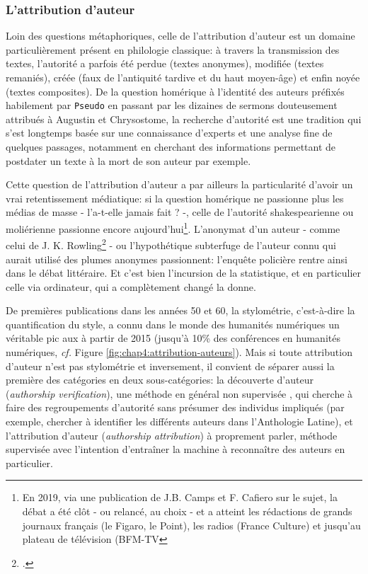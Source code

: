 \subsubsection{L'attribution d'auteur}

Loin des questions métaphoriques, celle de l'attribution d'auteur est un domaine particulièrement présent en philologie classique: à travers la transmission des textes, l'autorité a parfois été perdue (textes anonymes), modifiée (textes remaniés), créée (faux de l'antiquité tardive et du haut moyen-âge) et enfin noyée (textes composites). De la question homérique à l'identité des auteurs préfixés habilement par \texttt{Pseudo} en passant par les dizaines de sermons douteusement attribués à Augustin et Chrysostome, la recherche d'autorité est une tradition qui s'est longtemps basée sur une connaissance d'experts et une analyse fine de quelques passages, notamment en cherchant des informations permettant de postdater un texte à la mort de son auteur par exemple. 

Cette question de l'attribution d'auteur a par ailleurs la particularité d'avoir un vrai retentissement médiatique: si la question homérique ne passionne plus les médias de masse - l'a-t-elle jamais fait ? -, celle de l'autorité shakespearienne ou moliérienne passionne encore aujourd'hui\footnote{En 2019, via une publication de J.B. Camps et F. Cafiero sur le sujet, la débat a été clôt - ou relancé, au choix - et a atteint les rédactions de grands journaux français (le Figaro, le Point), les radios (France Culture) et jusqu'au plateau de télévision (BFM-TV}. L'anonymat d'un auteur - comme celui de J. K. Rowling\footcite{juola_how_2013} - ou l'hypothétique subterfuge de l'auteur connu qui aurait utilisé des plumes anonymes passionnent: l'enquête policière rentre ainsi dans le débat littéraire. Et c'est bien l'incursion de la statistique, et en particulier celle via ordinateur, qui a complètement changé la donne. 

De premières publications dans les années 50 et 60, la stylométrie, c'est-à-dire la quantification du style, a connu dans le monde des humanités numériques un véritable pic aux à partir de 2015 (jusqu'à 10\% des conférences en humanités numériques, \textit{cf.} Figure \ref{fig:chap4:attribution-auteurs}). Mais si toute attribution d'auteur n'est pas stylométrie et inversement, il convient de séparer aussi la première des catégories en deux sous-catégories: la découverte d'auteur (\textit{authorship verification}), une méthode en général non supervisée , qui cherche à faire des regroupements d'autorité sans présumer des individus impliqués (par exemple, chercher à identifier les différents auteurs dans l'Anthologie Latine), et l'attribution d'auteur (\textit{authorship attribution}) à proprement parler, méthode supervisée avec l'intention d'entraîner la machine à reconnaître des auteurs en particulier.

